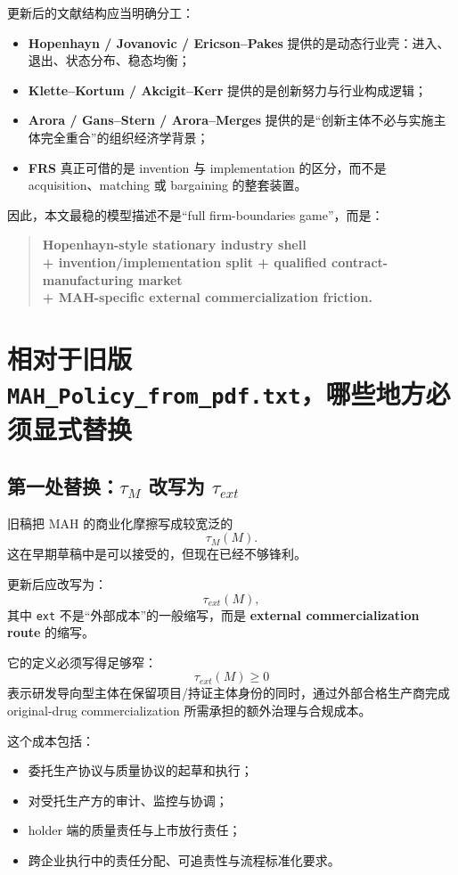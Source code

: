 \documentclass[12pt,fontset=none]{ctexart}
\begin{document}
更新后的文献结构应当明确分工：

\begin{itemize}
    \item \textbf{Hopenhayn / Jovanovic / Ericson--Pakes} 提供的是动态行业壳：进入、退出、状态分布、稳态均衡；
    \item \textbf{Klette--Kortum / Akcigit--Kerr} 提供的是创新努力与行业构成逻辑；
    \item \textbf{Arora / Gans--Stern / Arora--Merges} 提供的是“创新主体不必与实施主体完全重合”的组织经济学背景；
    \item \textbf{FRS} 真正可借的是 invention 与 implementation 的区分，而不是 acquisition、matching 或 bargaining 的整套装置。
\end{itemize}

因此，本文最稳的模型描述不是“full firm-boundaries game”，而是：

\begin{quote}
\raggedright
\textbf{Hopenhayn-style stationary industry shell}\\
\textbf{+ invention/implementation split + qualified contract-manufacturing market}\\
\textbf{+ MAH-specific external commercialization friction.}
\end{quote}

\section{相对于旧版 \texttt{MAH\_Policy\_from\_pdf.txt}，哪些地方必须显式替换}

\subsection{第一处替换：\texorpdfstring{$\tau_M$}{tauM} 改写为 \texorpdfstring{$\tau_{ext}$}{tau-ext}}

旧稿把 MAH 的商业化摩擦写成较宽泛的
\[
\tau_M(M).
\]
这在早期草稿中是可以接受的，但现在已经不够锋利。

更新后应改写为：
\[
\tau_{ext}(M),
\]
其中 \texttt{ext} 不是“外部成本”的一般缩写，而是 \textbf{external commercialization route} 的缩写。

它的定义必须写得足够窄：
\[
\tau_{ext}(M) \ge 0
\]
表示研发导向型主体在保留项目/持证主体身份的同时，通过外部合格生产商完成 original-drug commercialization 所需承担的额外治理与合规成本。

这个成本包括：
\begin{itemize}
    \item 委托生产协议与质量协议的起草和执行；
    \item 对受托生产方的审计、监控与协调；
    \item holder 端的质量责任与上市放行责任；
    \item 跨企业执行中的责任分配、可追责性与流程标准化要求。
\end{itemize}
\end{document}
